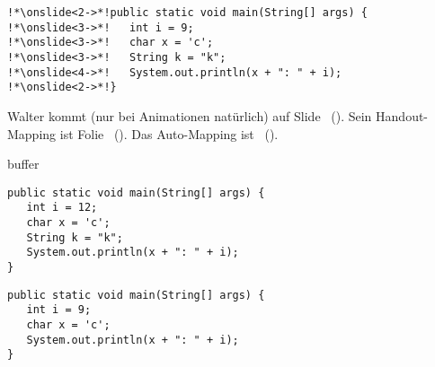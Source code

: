 \documentclass[handout]{beamer}
\begin{document}
\begin{frame}[fragile]
\begin{verbatim}
!*\onslide<2->*!public static void main(String[] args) {
!*\onslide<3->*!   int i = 9;
!*\onslide<3->*!   char x = 'c';
!*\onslide<3->*!   String k = "k";
!*\onslide<4->*!   System.out.println(x + ": " + i);
!*\onslide<2->*!}
\end{verbatim}
\endAnimateCode
Walter kommt (nur bei Animationen natürlich) auf Slide \WalterAnim~(). Sein Handout-Mapping ist Folie \WalterHandout~(). Das Auto-Mapping ist \Walter~(). %
\end{frame}

\begin{frame}
   buffer
\end{frame}

\begin{frame}[fragile]
\begin{verbatim}
public static void main(String[] args) {
   int i = 12;
   char x = 'c';
   String k = "k";
   System.out.println(x + ": " + i);
}
\end{verbatim}
\endAnimateCode
\end{frame}

\begin{frame}[fragile]
\begin{verbatim}
public static void main(String[] args) {
   int i = 9;
   char x = 'c';
   System.out.println(x + ": " + i);
}
\end{verbatim}
\end{frame}
\end{document}
